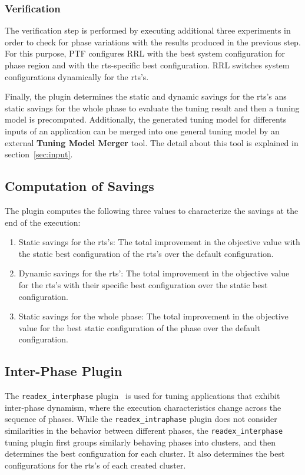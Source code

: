 \subsubsection{Verification} \label{intra-verification} 

The verification step is performed by executing additional three experiments in order to check for phase variations with the results produced in the previous step. For this purpose, PTF configures RRL with the best system configuration for phase region and with the rts-specific best configuration. RRL switches system configurations dynamically for the rts's. 

Finally, the plugin determines the static and dynamic savings for the rts's ans static savings for the whole phase to evaluate the tuning result and then a tuning model is precomputed. Additionally, the generated tuning model for differents inputs of an application can be merged into one general tuning model by an external \textbf{Tuning Model Merger} tool. The detail about this tool is explained in section~\ref{sec:input}.

\subsection{Computation of Savings} \label{sec:com-savings}

The plugin computes the following three values to characterize the savings at the end of the execution:
\begin{enumerate}
	\item Static savings for the rts's: The total improvement in the objective value with the static best configuration of the rts’s over the default configuration. 
	\item Dynamic savings for the rts’: The total improvement in the objective value for the rts’s with their specific best configuration over the static best configuration.
	\item Static savings for the whole phase: The total improvement in the objective value for the best static configuration of the phase over the default configuration.
\end{enumerate}
 
\subsection{Inter-Phase Plugin} \label{sec:inter-phase}
The \texttt{readex\_interphase} plugin~\cite{PDPTA_18_Kumaraswamy} is used for tuning applications that exhibit inter-phase dynamism, where the execution characteristics change across the sequence of phases. While the \texttt{readex\_intraphase} plugin does not consider similarities in the behavior between different phases, the \texttt{readex\_interphase} tuning plugin first groups similarly behaving phases into clusters, and then determines the best configuration for each cluster. It also determines the best configurations for the rts's of each created cluster.

